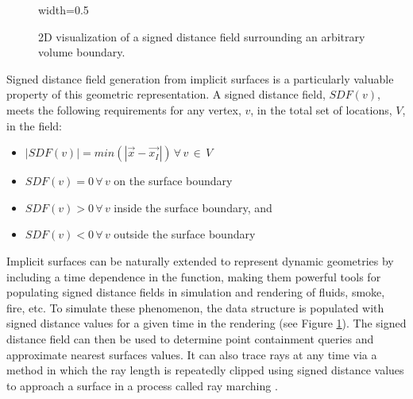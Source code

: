\begin{figure}[H]
  {width=0.5\textwidth}
  \centering
  \caption[2D depiction of a signed distance field.]{2D visualization of a signed distance field surrounding an arbitrary volume boundary.}
  \label{fig:preconditioner_datastruct}
\end{figure}





Signed distance field generation from implicit surfaces is a particularly
valuable property of this geometric representation. A signed distance field,
$SDF(v)$, meets the following requirements for any vertex, $v$, in the
total set of locations, $V$, in the field:

\begin{itemize}
\item $ |SDF(v)| = min(|\vec{x}-\vec{x_I}|) \, \forall \, v \, \in \, V$
\item $ SDF(v) = 0 \, \forall \, v$ on the surface boundary
\item $ SDF(v) > 0 \, \forall \, v$ inside the surface boundary, and
\item $ SDF(v) < 0 \, \forall \, v$ outside the surface boundary
\end{itemize}

Implicit surfaces can be naturally extended to represent dynamic geometries by
including a time dependence in the function, making them powerful tools for
populating signed distance fields in simulation and rendering of fluids, smoke,
fire, etc. To simulate these phenomenon, the data structure is populated with
signed distance values for a given time in the rendering (see Figure
\ref{fig:preconditioner_datastruct}). The signed distance field can then be used
to determine point containment queries and approximate nearest surfaces
values. It can also trace rays at any time via a method in which the ray length
is repeatedly clipped using signed distance values to approach a surface in a
process called ray marching \cite{Tomczak_2012}.


